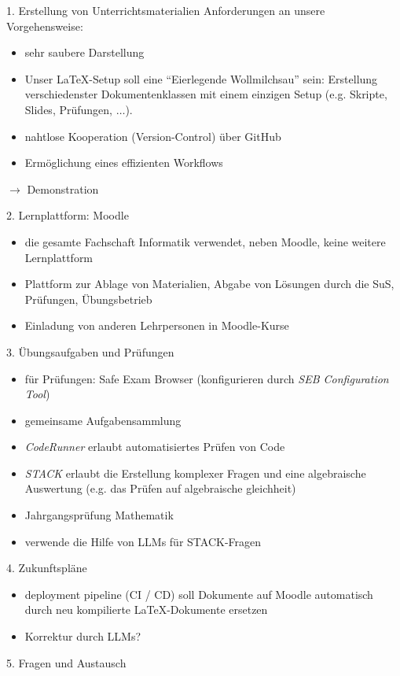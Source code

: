 \begin{frame}{1. Erstellung von Unterrichtsmaterialien}
	Anforderungen an unsere Vorgehensweise:
	\begin{itemize}
		\item sehr saubere Darstellung \pause
		\item Unser \LaTeX{}-Setup soll eine \enquote{Eierlegende Wollmilchsau} sein: Erstellung verschiedenster Dokumentenklassen mit einem einzigen Setup (e.g. Skripte, Slides, Prüfungen, $\ldots$). \pause
		\item nahtlose Kooperation (Version-Control) über GitHub \pause
		\item Ermöglichung eines effizienten Workflows \pause
	\end{itemize}
	$\rightarrow$ Demonstration
\end{frame}

\begin{frame}{2. Lernplattform: Moodle}
	\begin{itemize}
		\item die gesamte Fachschaft Informatik verwendet, neben Moodle, keine weitere Lernplattform \pause
		\item Plattform zur Ablage von Materialien, Abgabe von Lösungen durch die SuS, Prüfungen, Übungsbetrieb \pause
		\item Einladung von anderen Lehrpersonen in Moodle-Kurse
	\end{itemize}
\end{frame}


\begin{frame}{3. Übungsaufgaben und Prüfungen}
	\begin{itemize}
		\item für Prüfungen: Safe Exam Browser (konfigurieren durch \textit{SEB Configuration Tool}) \pause
		\item gemeinsame Aufgabensammlung \pause
		\item \textit{CodeRunner} erlaubt automatisiertes Prüfen von Code \pause
		\item \textit{STACK} erlaubt die Erstellung komplexer Fragen und eine algebraische Auswertung (e.g. das Prüfen auf algebraische gleichheit) \pause
		\item Jahrgangsprüfung Mathematik \pause
		\item verwende die Hilfe von LLMs für STACK-Fragen
	\end{itemize}
\end{frame}

\begin{frame}{4. Zukunftspläne}
	\begin{itemize}
		\item deployment pipeline (CI / CD) soll Dokumente auf Moodle automatisch durch neu kompilierte \LaTeX{}-Dokumente ersetzen
		\item Korrektur durch LLMs?
	\end{itemize}
\end{frame}


\begin{frame}{5. Fragen und Austausch}
	\centering
\end{frame}

